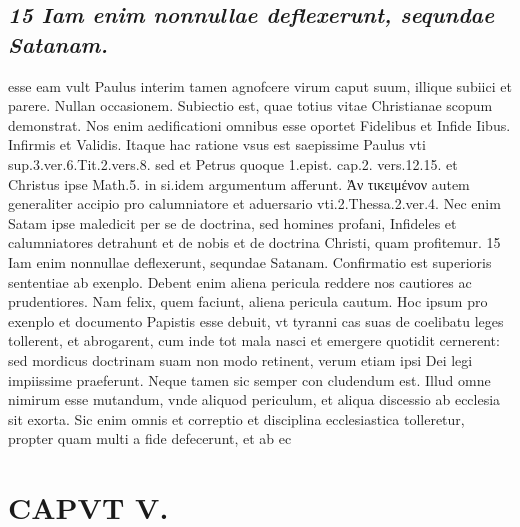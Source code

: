 \documentclass{article}
\begin{document}
\begin{pages}
\subsection*{\textit{15 Iam enim nonnullae deflexerunt, sequndae Satanam.}}esse eam vult Paulus interim tamen agnofcere virum caput suum, illique subiici et parere. Nullan occasionem. Subiectio est, quae totius vitae Christianae scopum demonstrat. Nos enim aedificationi omnibus esse oportet Fidelibus et Infide Iibus. Infirmis et Validis. Itaque hac ratione vsus est saepissime Paulus vti sup.3.ver.6.Tit.2.vers.8. sed et Petrus quoque 1.epist. cap.2. vers.12.15. et Christus ipse Math.5. in si.idem argumentum afferunt. Ἀν τικειμένον autem generaliter accipio pro calumniatore et aduersario vti.2.Thessa.2.ver.4. Nec enim Satam ipse maledicit per se de doctrina, sed homines profani, Infideles et calumniatores detrahunt et de nobis et de doctrina Christi, quam profitemur. 15 Iam enim nonnullae deflexerunt, sequndae Satanam. Confirmatio est superioris sententiae ab exenplo. Debent enim aliena pericula reddere nos cautiores ac prudentiores. Nam felix, quem faciunt, aliena pericula cautum. Hoc ipsum pro exenplo et documento Papistis esse debuit, vt tyranni cas suas de coelibatu leges tollerent, et abrogarent, cum inde tot mala nasci et emergere quotidit cernerent: sed mordicus doctrinam suam non modo retinent, verum etiam ipsi Dei legi impiissime praeferunt. Neque tamen sic semper con cludendum est. Illud omne nimirum esse mutandum, vnde aliquod periculum, et aliqua discessio ab ecclesia sit exorta. Sic enim omnis et correptio et disciplina ecclesiastica tolleretur, propter quam multi a fide defecerunt, et ab ec\pend
\section*{CAPVT  V. }
\marginpar{[ p.301 ]}\pstart {}
{}

\end{pages}
\end{document}
